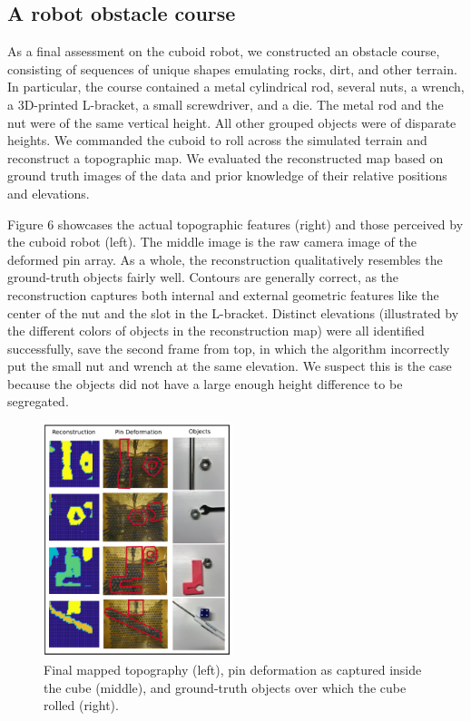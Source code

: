 \documentclass[letterpaper, 12 pt, conference]{ieeeconf}  %
\begin{document}
\subsection{A robot obstacle course}

As a final assessment on the cuboid robot, we constructed an obstacle course, consisting of sequences of unique shapes emulating rocks, dirt, and other terrain. In particular, the course contained a metal cylindrical rod, several nuts, a wrench, a 3D-printed L-bracket, a small screwdriver, and a die. The metal rod and the nut were of the same vertical height. All other grouped objects were of disparate heights. We commanded the cuboid to roll across the simulated terrain and reconstruct a topographic map. We evaluated the reconstructed map based on ground truth images of the data and prior knowledge of their relative positions and elevations. 

Figure 6 showcases the actual topographic features (right) and those perceived by the cuboid robot (left). The middle image is the raw camera image of the deformed pin array. As a whole, the reconstruction qualitatively resembles the ground-truth objects fairly well. Contours are generally correct, as the reconstruction captures both internal and external geometric features like the center of the nut and the slot in the L-bracket. Distinct elevations (illustrated by the different colors of objects in the reconstruction map) were all identified successfully, save the second frame from top, in which the algorithm incorrectly put the small nut and wrench at the same elevation. We suspect this is the case because the objects did not have a large enough height difference to be segregated. 

\begin{figure}
\centering
\includegraphics[width=0.49\textwidth]{Figures/Fig7.png}
\caption{Final mapped topography (left), pin deformation as captured inside the cube (middle), and ground-truth objects over which the cube rolled (right).}
\label{fig:obstacle course} 
\end{figure}
\end{document}
